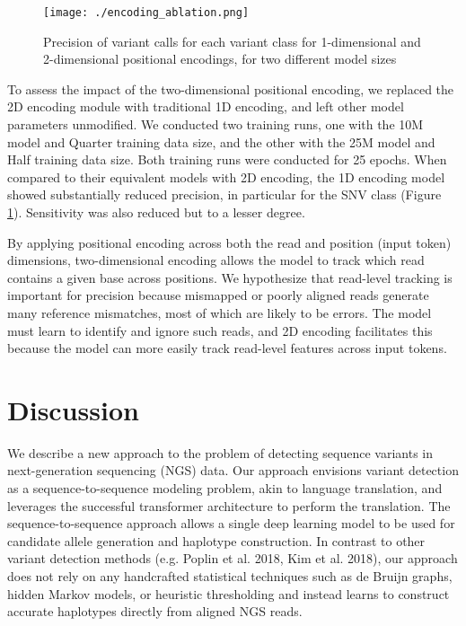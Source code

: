 \documentclass[]{article}
\begin{document}
\begin{figure}[htp]
	\texttt{[image: ./encoding\_ablation.png]}
	\caption{ Precision of variant calls for each variant class for 1-dimensional and 2-dimensional positional encodings, for two different model sizes }
	\label{fig:encoding_ablation}
\end{figure}

To assess the impact of the two-dimensional positional encoding, we replaced the 2D encoding module with traditional 1D encoding, and left other model parameters unmodified. We conducted two training runs, one with the 10M model and Quarter training data size, and the other with the 25M model and Half training data size. Both training runs were conducted for 25 epochs. When compared to their equivalent models with 2D encoding, the 1D encoding model showed substantially reduced precision, in particular for the SNV class (Figure \ref{fig:encoding_ablation}). Sensitivity was also reduced but to a lesser degree. 

By applying positional encoding across both the read and position (input token) dimensions, two-dimensional encoding allows the model to track which read contains a given base across positions. We hypothesize that read-level tracking is important for precision because mismapped or poorly aligned reads generate many reference mismatches, most of which are likely to be errors. The model must learn to identify and ignore such reads, and 2D encoding facilitates this because the model can more easily track read-level features across input tokens. 
 

\section{Discussion}

We describe a new approach to the problem of detecting sequence variants in next-generation sequencing (NGS) data. Our approach envisions variant detection as a sequence-to-sequence modeling problem, akin to language translation, and leverages the successful transformer architecture to perform the translation. The sequence-to-sequence approach allows a single deep learning model to be used for candidate allele generation and haplotype construction.  In contrast to other variant detection methods (e.g. Poplin et al. 2018,  Kim et al. 2018), our approach does not rely on any handcrafted statistical techniques such as de Bruijn graphs, hidden Markov models, or heuristic thresholding and instead learns to construct accurate haplotypes directly from aligned NGS reads. 
 
\end{document}
